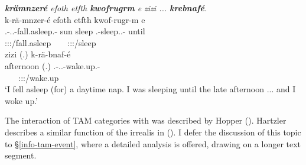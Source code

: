 \begin{exe}
	\ex \emph{\textbf{krämnzeré} efoth etfth \textbf{kwofrugrm} e zizi ... \textbf{krebnafé}.}\\
	\glll k-rä-mnzer-é efoth etfth kwof-rugr-m e\\
	\M.\Bet-\Irr.\Vc.\Ndu-fall.asleep.\Rs-\Fsg{} sun sleep \Fsg.\Betatwo-sleep.\Ext.\Ndu-\Dur{} until\\
	{\footnotesize \Fsg:\Sbj:\Irr:\Pfv/fall.asleep} ~ ~ {\footnotesize \Fsg:\Sbj:\Pst:\Dur/sleep} ~\\
	\sn
	\glll zizi (.) k-rä-bnaf-é\\
	afternoon (.) \M.\Bet-\Irr.\Vc.\Ndu-wake.up.\Rs-\Fsg{}\\
	~ ~ {\footnotesize \Fsg:\Sbj:\Irr:\Pfv/wake.up}\\
	\trans `I fell asleep (for) a daytime nap. I was sleeping until the late afternoon ... and I woke up.' 
	\label{ex377}
\end{exe}

The interaction of TAM categories with  was described by Hopper (\citeyear{Hopper:1979us}). Hartzler describes a similar function of the irrealis  in  (\citeyear{Hartzler:1983wm}). I defer the discussion of this topic to {\S}\ref{info-tam-event}, where a detailed analysis is offered, drawing on a longer text segment.